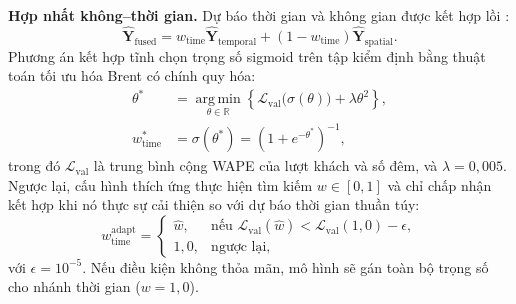 \documentclass[10pt,journal,compsoc]{IEEEtran}
\begin{document}
\noindent \textbf{Hợp nhất không--thời gian.} Dự báo thời gian và không gian được kết hợp lồi \cite{jacobs1991adaptive,shazeer2017moe}:
\begin{equation}
\hat{\mathbf{Y}}_{\text{fused}} = w_{\text{time}} \hat{\mathbf{Y}}_{\text{temporal}} + (1 - w_{\text{time}}) \hat{\mathbf{Y}}_{\text{spatial}}.
\label{eq:convex_blend}
\end{equation}
Phương án kết hợp tĩnh chọn trọng số sigmoid trên tập kiểm định bằng thuật toán tối ưu hóa Brent có chính quy hóa:
\begin{equation}
\begin{aligned}
\theta^* &= \operatorname*{arg\,min}_{\theta \in \mathbb{R}} \left\{ \mathcal{L}_{\text{val}}\big(\sigma(\theta)\big) + \lambda \theta^2 \right\}, \\
w_{\text{time}}^* &= \sigma(\theta^*) = (1 + e^{-\theta^*})^{-1},
\end{aligned}
\label{eq:static_gate}
\end{equation}
trong đó $\mathcal{L}_{\text{val}}$ là trung bình cộng WAPE của lượt khách và số đêm, và $\lambda=0{,}005$. Ngược lại, cấu hình thích ứng thực hiện tìm kiếm $w\in[0,1]$ và chỉ chấp nhận kết hợp khi nó thực sự cải thiện so với dự báo thời gian thuần túy:
\begin{equation}
w_{\text{time}}^{\text{adapt}} = \begin{cases}
\hat{w}, & \text{nếu } \mathcal{L}_{\text{val}}(\hat{w}) < \mathcal{L}_{\text{val}}(1{,}0) - \epsilon, \\
1{,}0, & \text{ngược lại},
\end{cases}
\label{eq:adaptive_fallback}
\end{equation}
với $\epsilon=10^{-5}$. Nếu điều kiện không thỏa mãn, mô hình sẽ gán toàn bộ trọng số cho nhánh thời gian ($w=1{,}0$).
\end{document}
